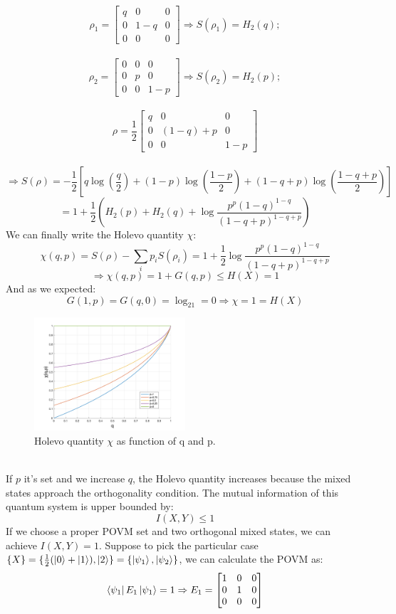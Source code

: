 \documentclass[journal, letterpaper]{IEEEtran}
\begin{document}
\[\rho_1 = \begin{bmatrix}
    q & 0 & 0 \\
    0 & 1-q & 0 \\
0 & 0 & 0
\end{bmatrix} \Rightarrow S(\rho_1) = H_2(q);\]
\\
\[\rho_2 = \begin{bmatrix}
    0 & 0 & 0 \\
    0 & p & 0 \\
0 & 0 & 1-p
\end{bmatrix} \Rightarrow S(\rho_2)=H_2(p);\]
\\
\[\rho = \frac{1}{2}\begin{bmatrix}
    q & 0 & 0 \\
    0 & (1-q)+p & 0 \\
0 & 0 & 1-p
\end{bmatrix}\] 
\\
\[ \Rightarrow S(\rho)=-\frac{1}{2}[q\log(\frac{q}{2})+(1-p)\log(\frac{1-p}{2}) +(1-q+p)\log(\frac{1-q+p}{2})]\]
\[= 1+\frac{1}{2}(H_2(p)+H_2(q)+\log\frac{p^p(1-q)^{1-q}}{(1-q+p)^{1-q+p}}) \]
We can finally write the Holevo quantity $\chi$: 
\\
\[\chi(q,p) = S(\rho)-\sum_ip_iS(\rho_i) = 1+\frac{1}{2}\log\frac{p^p(1-q)^{1-q}}{(1-q+p)^{1-q+p}} \]
\[\Rightarrow \chi(q,p) = 1+ G(q,p) \le H(X) = 1\]
And as we expected: \[G(1,p) = G(q,0) = \log_21 = 0 \Rightarrow \chi = 1 = H(X)\]
\begin{figure}[!h]
    \centering
    \includegraphics[width=0.5\textwidth]{Images/graficus.png}
        \caption{Holevo quantity $\chi$ as function of q and p.}
     \label{fig:quadtree}
\end{figure} 
\\
If $p$ it's set and we increase $q$, the Holevo quantity increases because the mixed states approach the orthogonality condition. The mutual information of this quantum system is upper bounded by:
\[I(X,Y) \le 1\]
If we choose a proper POVM set and two orthogonal mixed states, we can achieve $I(X,Y) = 1$. Suppose to pick the particular case $\{X\} = \{\frac{1}{2}(\ket{0}+\ket{1}),\ket{2}\}=\{\ket{\psi_1},\ket{\psi_2}\}$, we can calculate the POVM as: 
\[\bra{\psi_1}E_1\ket{\psi_1} = 1 \Rightarrow E_1 = \begin{bmatrix}
    1 & 0 & 0 \\
    0 & 1 & 0 \\
0 & 0 & 0
\end{bmatrix} \]
\end{document}
